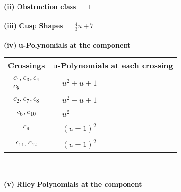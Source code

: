 \documentclass[1p]{elsarticle_modified}
\theoremstyle{definition}
\begin{document}
\flushleft \textbf{(ii) Obstruction class $= 1$}\\~\\
\flushleft \textbf{(iii) Cusp Shapes $= \frac{4}{3} u+7$}\\~\\
\newpage\renewcommand{\arraystretch}{1}
\flushleft \textbf{(iv) u-Polynomials at the component}\newline \\
\begin{tabular}{m{50pt}|m{274pt}}
Crossings & \hspace{64pt}u-Polynomials at each crossing \\
\hline $$\begin{aligned}c_{1},c_{3},c_{4}\\c_{5}\end{aligned}$$&$\begin{aligned}
&u^2+u+1
\end{aligned}$\\
\hline $$\begin{aligned}c_{2},c_{7},c_{8}\end{aligned}$$&$\begin{aligned}
&u^2- u+1
\end{aligned}$\\
\hline $$\begin{aligned}c_{6},c_{10}\end{aligned}$$&$\begin{aligned}
&u^2
\end{aligned}$\\
\hline $$\begin{aligned}c_{9}\end{aligned}$$&$\begin{aligned}
&(u+1)^2
\end{aligned}$\\
\hline $$\begin{aligned}c_{11},c_{12}\end{aligned}$$&$\begin{aligned}
&(u-1)^2
\end{aligned}$\\
\hline
\end{tabular}\\~\\
\newpage\renewcommand{\arraystretch}{1}
\flushleft \textbf{(v) Riley Polynomials at the component}\newline \\
\end{document}
